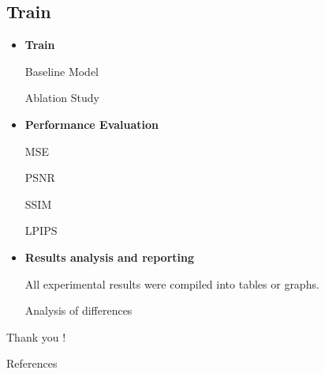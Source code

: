 \documentclass[CJK,aspectratio=169]{beamer}  %
\begin{document}
	\subsection{Train}
	
	\begin{frame}
		\begin{itemize}
			\item \textbf{Train}
			
			\checkmark Baseline Model
			
			\checkmark Ablation Study
		\end{itemize}
		
		\begin{itemize}
			\item \textbf{Performance Evaluation}
			
			\checkmark MSE
			
			\checkmark PSNR
			
			\checkmark SSIM
			
			\checkmark LPIPS
		\end{itemize}
		
		\begin{itemize}
			\item \textbf{Results analysis and reporting}
			
			\checkmark All experimental results were compiled into tables or graphs.
			
			\checkmark Analysis of differences
		\end{itemize}
				
	\end{frame}
	
	
	
	\begin{frame}[plain,c]
		\begin{center}
			\Huge Thank you !
		\end{center}
	\end{frame}
	
	\appendix
	\begin{frame}[allowframebreaks]{References}
		\tiny
		
		
	\end{frame}
	
\end{document}
